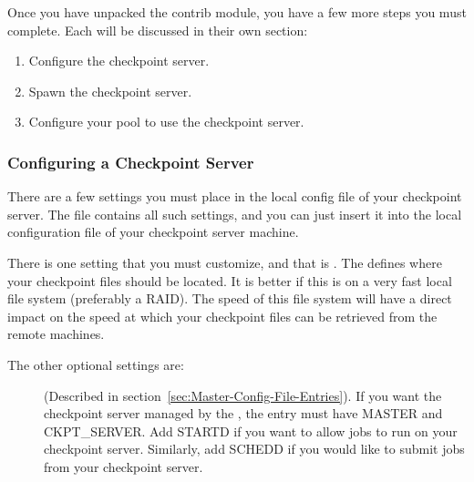 Once you have unpacked the contrib module, you have a few more steps
you must complete.
Each will be discussed in their own section:
\begin{enumerate}
\item Configure the checkpoint server.
\item Spawn the checkpoint server.
\item Configure your pool to use the checkpoint server.
\end{enumerate}

\subsubsection{\label{sec:Configure-Ckpt-Server}
Configuring a Checkpoint Server} 

There are a few settings you must place in the local config file of
your checkpoint server.  
The file  contains
all such settings, and you can just insert it into the local
configuration file of your checkpoint server machine. 

There is one setting that you must customize, and that is
.  
The  defines where your checkpoint files
should be located. 
It is better if this is on a very fast local file system (preferably a
RAID). 
The speed of this file system will have a direct impact on the speed
at which your checkpoint files can be retrieved from the remote
machines. 

The other optional settings are:
\begin{description}

\item[] (Described in
section~\ref{sec:Master-Config-File-Entries}).  
If you want the checkpoint server managed by the , the
 entry must have MASTER and CKPT\_SERVER.
Add STARTD if you want to allow jobs to run on your checkpoint server.
Similarly, add SCHEDD if you would like to submit jobs from your
checkpoint server. 

\end{description}

